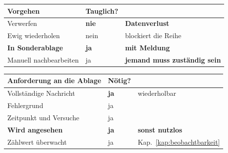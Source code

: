 \begin{aufgabe}
\begin{center}
{\small
\renewcommand{\arraystretch}{1.5}
\begin{tabular}{@{}P{2.8cm}P{2.4cm}P{2.6cm}@{}}
\toprule
\textbf{Vorgehen} & \textbf{Tauglich?} & \\
\midrule
Verwerfen & \textcolor{akzent}{\textbf{nie}} & \textcolor{akzent}{\textbf{Datenverlust}}\\
Ewig wiederholen & \textcolor{akzent}{nein} & \textcolor{akzent}{blockiert die Reihe}\\
\textbf{In Sonderablage} & \textcolor{gruen}{\textbf{ja}} & \textcolor{gruen}{\textbf{mit Meldung}}\\
Manuell nachbearbeiten & \textcolor{gruen}{ja} & \textbf{jemand muss zuständig sein}\\
\bottomrule
\end{tabular}}
\end{center}

\begin{center}
\begin{minipage}{0.88\textwidth}
\end{minipage}
\end{center}

\begin{center}
\renewcommand{\arraystretch}{1.45}
\begin{tabular}{@{}P{3.0cm}P{2.2cm}P{2.8cm}@{}}
\toprule
\textbf{Anforderung an die Ablage} & \textbf{Nötig?} & \\
\midrule
Vollständige Nachricht & \textcolor{gruen}{\textbf{ja}} & \textcolor{gruen}{wiederholbar}\\
Fehlergrund & \textcolor{gruen}{ja} & \\
Zeitpunkt und Versuche & \textcolor{gruen}{ja} & \\
\textbf{Wird angesehen} & \textcolor{gruen}{\textbf{ja}} & \textcolor{akzent}{\textbf{sonst nutzlos}}\\
Zählwert überwacht & \textcolor{gruen}{ja} & \textcolor{gruen}{Kap.~\ref{kap:beobachtbarkeit}}\\
\bottomrule
\end{tabular}
\end{center}

\begin{center}
\end{center}


\end{aufgabe}
